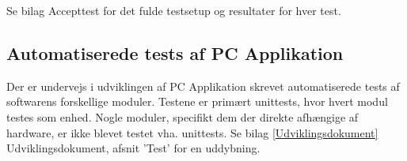 Se bilag Accepttest for det fulde testsetup og resultater for hver test. 

\subsection{Automatiserede tests af PC Applikation}
Der er undervejs i udviklingen af PC Applikation skrevet automatiserede tests af softwarens forskellige moduler. Testene er primært unittests, hvor hvert modul testes som enhed. Nogle moduler, specifikt dem der direkte afhængige af hardware, er ikke blevet testet vha. unittests. Se bilag \ref{Udviklingsdokument} Udviklingsdokument, afsnit 'Test' for en uddybning.